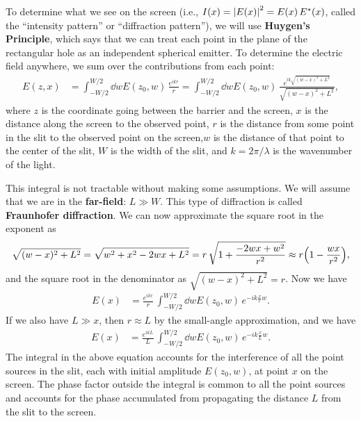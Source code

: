 \documentclass[]{manual}
\begin{document}
    To determine what we see on the screen (i.e., $I(x) = \abs{E(x)}^2 = E(x) \, E^*(x)$, called the ``intensity pattern'' or ``diffraction pattern''), we will use \textbf{Huygen's Principle}, which says that we can treat each point in the plane of the rectangular hole as an independent spherical emitter.
    To determine the electric field anywhere, we sum over the contributions from each point:
    \begin{align}
        E(z, x) &= \int^{W/2}_{-W/2} \dd{w} E(z_0, w) \, \frac{e^{i k r}}{r} = \int^{W/2}_{-W/2} \dd{w} E(z_0, w) \, \frac{e^{i k \sqrt{(w-x)^2 + L^2}}}{\sqrt{(w-x)^2 + L^2}},
    \end{align}
    where $z$ is the coordinate going between the barrier and the screen, $x$ is the distance along the screen to the observed point, $r$ is the distance from some point in the slit to the observed point on the screen,$w$ is the distance of that point to the center of the slit, $W$ is the width of the slit, and $k = 2 \pi / \lambda$ is the wavenumber of the light.

    This integral is not tractable without making some assumptions.
    We will assume that we are in the \textbf{far-field}: $L \gg W$.
    This type of diffraction is called \textbf{Fraunhofer diffraction}.
    We can now approximate the square root in the exponent as
    \begin{align} \label{eqn:fraunhoffer-square-root-approx}
        \sqrt{(w-x)^2 + L^2} = \sqrt{w^2 + x^2 - 2wx + L^2} = r \, \sqrt{1 + \frac{-2wx + w^2}{r^2}} \approx r \qty(1 - \frac{wx}{r^2}),
    \end{align}
    and the square root in the denominator as $\sqrt{(w-x)^2 + L^2} = r$. 
    Now we have
    \begin{align} \label{eqn:fraunhofer-diffraction-integral}
        E(x) &= \frac{e^{i k r}}{r} \, \int^{W/2}_{-W/2} \dd{w} E(z_0, w) \, e^{-i k \frac{x}{r} w}.
    \end{align}
    If we also have $L \gg x$, then $r \approx L$ by the small-angle approximation, and we have
    \begin{align} \label{eqn:fraunhofer-diffraction-integral-with-L}
        E(x) &= \frac{e^{i k L}}{L} \, \int^{W/2}_{-W/2} \dd{w} E(z_0, w) \, e^{-i k \frac{x}{L} w}.
    \end{align}
    The integral in the above equation accounts for the interference of all the point sources in the slit, each with initial amplitude $E(z_0, w)$, at point $x$ on the screen.  The phase factor outside the integral is common to all the point sources and accounts for the phase accumulated from propagating the distance $L$ from the slit to the screen.
    
\end{document}
